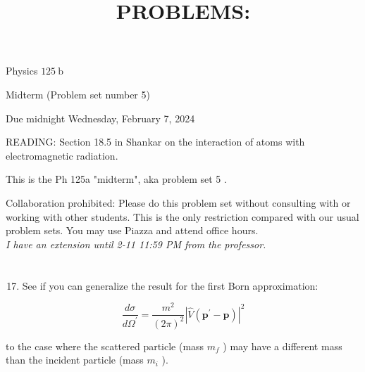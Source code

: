\documentclass[12pt]{article}
\title{PROBLEMS: }
\author{}
\date{}
\begin{document}
\maketitle
Physics $125 \mathrm{~b}$

Midterm (Problem set number 5)

Due midnight Wednesday, February 7, 2024

READING: Section 18.5 in Shankar on the interaction of atoms with electromagnetic radiation.

This is the Ph 125a "midterm", aka problem set 5 .

Collaboration prohibited: Please do this problem set without consulting with or working with other students. This is the only restriction compared with our usual problem sets. You may use Piazza and attend office hours.\\
\emph{I have an extension until 2-11 11:59 PM from the professor.}
\section{}
\begin{enumerate}
  \setcounter{enumi}{16}
  \item See if you can generalize the result for the first Born approximation:
\end{enumerate}

$$
\frac{d \sigma}{d \Omega^{\prime}}=\frac{m^{2}}{(2 \pi)^{2}}\left|\hat{V}\left(\mathbf{p}^{\prime}-\mathbf{p}\right)\right|^{2}
$$

to the case where the scattered particle (mass $m_{f}$ ) may have a different mass than the incident particle (mass $m_{i}$ ).
\end{document}
